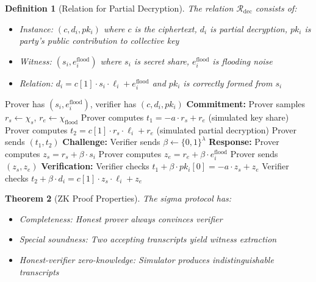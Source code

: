 \documentclass[11pt,a4paper]{article}
\newtheorem{theorem}{Theorem}[section]
\newtheorem{definition}[theorem]{Definition}
\begin{document}
\begin{definition}[Relation for Partial Decryption]
The relation $\mathcal{R}_{\text{dec}}$ consists of:
\begin{itemize}
    \item Instance: $(c, d_i, pk_i)$ where $c$ is the ciphertext, $d_i$ is partial decryption, $pk_i$ is party's public contribution to collective key
    \item Witness: $(s_i, e_i^{\text{flood}})$ where $s_i$ is secret share, $e_i^{\text{flood}}$ is flooding noise
    \item Relation: $d_i = c[1] \cdot s_i \cdot \ell_i + e_i^{\text{flood}}$ and $pk_i$ is correctly formed from $s_i$
\end{itemize}
\end{definition}

\begin{algorithm}
\caption{Sigma Protocol for Partial Decryption}
\begin{algorithmic}[1]
\Require Prover has $(s_i, e_i^{\text{flood}})$, verifier has $(c, d_i, pk_i)$
\State \textbf{Commitment:}
\State Prover samples $r_s \leftarrow \chi_s$, $r_e \leftarrow \chi_{\text{flood}}$
\State Prover computes $t_1 = -a \cdot r_s + r_e$ (simulated key share)
\State Prover computes $t_2 = c[1] \cdot r_s \cdot \ell_i + r_e$ (simulated partial decryption)
\State Prover sends $(t_1, t_2)$
\State \textbf{Challenge:}
\State Verifier sends $\beta \leftarrow \{0, 1\}^{\lambda}$
\State \textbf{Response:}
\State Prover computes $z_s = r_s + \beta \cdot s_i$
\State Prover computes $z_e = r_e + \beta \cdot e_i^{\text{flood}}$
\State Prover sends $(z_s, z_e)$
\State \textbf{Verification:}
\State Verifier checks $t_1 + \beta \cdot pk_i[0] = -a \cdot z_s + z_e$
\State Verifier checks $t_2 + \beta \cdot d_i = c[1] \cdot z_s \cdot \ell_i + z_e$
\end{algorithmic}
\end{algorithm}

\begin{theorem}[ZK Proof Properties]
The sigma protocol has:
\begin{itemize}
    \item Completeness: Honest prover always convinces verifier
    \item Special soundness: Two accepting transcripts yield witness extraction
    \item Honest-verifier zero-knowledge: Simulator produces indistinguishable transcripts
\end{itemize}
\end{theorem}
\end{document}
